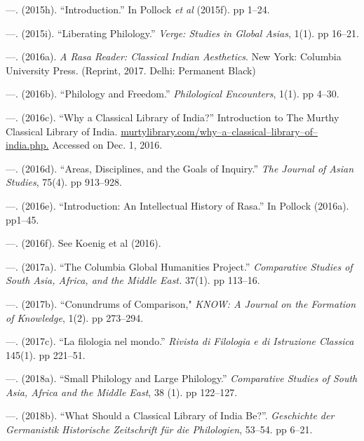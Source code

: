 \begin{thebibliography}{99}
 \item —. (2015h). “Introduction.” In Pollock \textit{et al} (2015f). pp 1–24.

 \item —. (2015i). “Liberating Philology.” \textit{Verge: Studies in Global Asias}, 1(1). pp 16–21.

 \item —. (2016a). \textit{A Rasa Reader: Classical Indian Aesthetics}. New York: Columbia University Press. (Reprint, 2017. Delhi: Permanent Black)

 \item —. (2016b). “Philology and Freedom.” \textit{Philological Encounters}, 1(1). pp 4–30.

 \item —. (2016c). “Why a Classical Library of India?” Introduction to The Murthy Classical Library of India. \url{murtylibrary.com/why–a–classical–library–of–india.php.} Accessed on Dec. 1, 2016.

 \item —. (2016d). “Areas, Disciplines, and the Goals of Inquiry.” \textit{The Journal of Asian Studies}, 75(4). pp 913–928.

 \item —. (2016e). “Introduction: An Intellectual History of Rasa.” In Pollock (2016a). pp1–45.

 \item —. (2016f). See Koenig et al (2016).

 \item —. (2017a). “The Columbia Global Humanities Project.” \textit{Comparative Studies of South Asia, Africa, and the Middle East.} 37(1). pp 113–16.

 \item —. (2017b). “Conundrums of Comparison," \textit{KNOW: A Journal on the Formation of Knowledge}, 1(2). pp 273–294.

 \item —. (2017c). “La filologia nel mondo.” \textit{Rivista di Filologia e di Istruzione Classica} 145(1). pp 221–51.

 \item —. (2018a). “Small Philology and Large Philology.” \textit{Comparative Studies of South Asia, Africa and the Middle East}, 38 (1). pp 122–127.

 \item —. (2018b). “What Should a Classical Library of India Be?”. \textit{Geschichte der Germanistik Historische Zeitschrift für die Philologien}, 53–54. pp 6–21.


\end{thebibliography}

